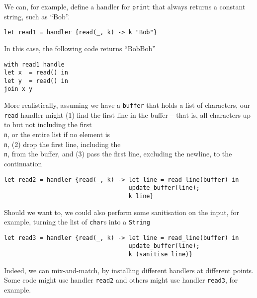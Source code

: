 We can, for example, define a handler for \texttt{print} that always returns a constant string, such as ``Bob''.
\begin{verbatim}
let read1 = handler {read(_, k) -> k "Bob"}
\end{verbatim}
In this case, the following code returns ``BobBob''
\begin{verbatim}
with read1 handle 
let x  = read() in 
let y  = read() in
join x y
\end{verbatim}
More realistically, assuming we have a \texttt{buffer} that holds a list of characters, our \texttt{read} handler might (1) find the first line in the buffer -- that is, all characters up to but not including the first \texttt{\\n}, or the entire list if no element is \texttt{\\n}, (2) drop the first line, including the \texttt{\\n}, from the buffer, and (3) pass the first line, excluding the newline, to the continuation
\begin{verbatim}
let read2 = handler {read(_, k) -> let line = read_line(buffer) in 
                                   update_buffer(line);
                                   k line}
\end{verbatim}
Should we want to, we could also perform some sanitisation on the input, for example, turning the list of \texttt{char}s into a \texttt{String}
\begin{verbatim}
let read3 = handler {read(_, k) -> let line = read_line(buffer) in 
                                   update_buffer(line);
                                   k (sanitise line)}
\end{verbatim}
Indeed, we can mix-and-match, by installing different handlers at different points. Some code might use handler \texttt{read2} and others might use handler \texttt{read3}, for example.

